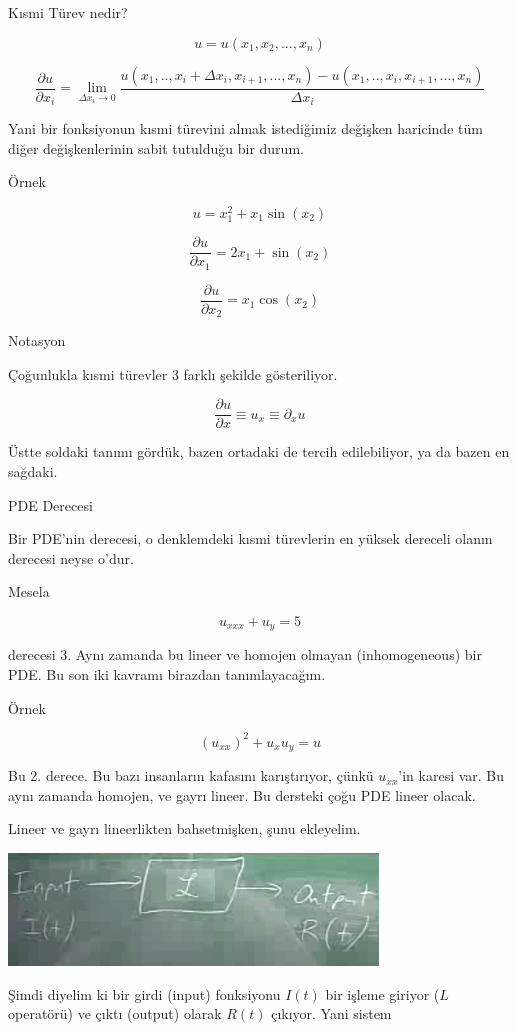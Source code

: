 \documentclass[12pt,fleqn]{article}\usepackage{../../common}
\begin{document}
Kısmi Türev nedir? 

$$ u = u(x_1, x_2,...,x_n) $$

$$ 
\frac{\partial u}{\partial x_i} = 
\lim_{\Delta x_i \to 0} 
\frac{
u(x_1,..,x_i+\Delta x_i,x_{i+1},...,x_n) - u(x_1,..,x_i,x_{i+1},...,x_n)}
{\Delta x_i}  $$

Yani bir fonksiyonun kısmi türevini almak istediğimiz değişken haricinde
tüm diğer değişkenlerinin sabit tutulduğu bir durum. 

Örnek

$$ u = x_1^2 + x_1\sin(x_2) $$

$$ 
\frac{\partial u}{\partial x_1} = 2x_1 + \sin(x_2)
 $$

$$ 
\frac{\partial u}{\partial x_2} = x_1 \cos(x_2)
 $$

Notasyon

Çoğunlukla kısmi türevler 3 farklı şekilde gösteriliyor. 

$$ \frac{\partial u}{\partial x} \equiv u_x \equiv \partial_x u $$

Üstte soldaki tanımı gördük, bazen ortadaki de tercih edilebiliyor, ya da
bazen en sağdaki. 

PDE Derecesi

Bir PDE'nin derecesi, o denklemdeki kısmi türevlerin en yüksek dereceli
olanın derecesi neyse o'dur.

Mesela

$$ u_{xxx} + u_y = 5 $$

derecesi 3. Aynı zamanda bu lineer ve homojen olmayan (inhomogeneous) bir
PDE. Bu son iki kavramı birazdan tanımlayacağım. 

Örnek 

$$ (u_{xx})^2 + u_xu_y = u $$

Bu 2. derece. Bu bazı insanların kafasını karıştırıyor, çünkü $u_{xx}$'in
karesi var. Bu aynı zamanda homojen, ve gayrı lineer. Bu dersteki çoğu PDE
lineer olacak. 

Lineer ve gayrı lineerlikten bahsetmişken, şunu ekleyelim. 

\includegraphics[height=3cm]{1_5.png}

Şimdi diyelim ki bir girdi (input) fonksiyonu $I(t)$ bir işleme giriyor
($L$ operatörü) ve çıktı (output) olarak $R(t)$ çıkıyor. Yani sistem
\end{document}
